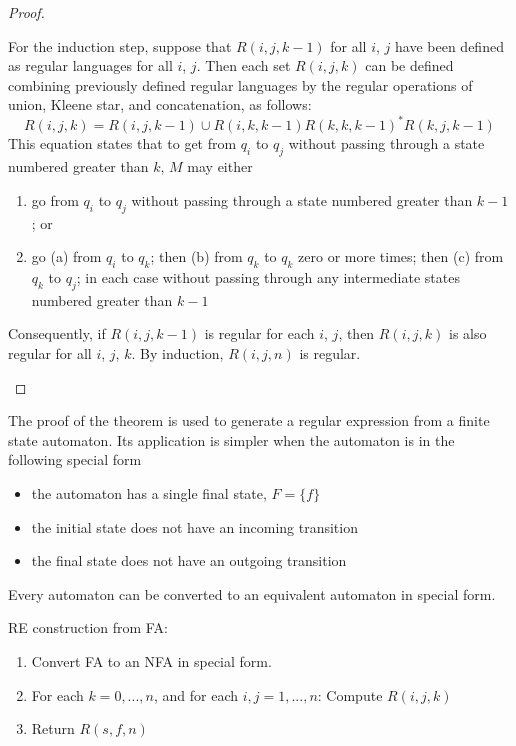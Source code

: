 \begin{proof}
\begin{itemize}
    \quad For the induction step, suppose that $R(i, j, k-1)$ for all $i$, $j$ have been defined as regular languages for all $i$, $j$. Then each set $R(i, j, k)$ can be defined combining previously defined regular languages by the regular operations of union, Kleene star, and concatenation, as follows:
    \begin{equation*}
      R(i, j, k) = R(i, j, k - 1) \cup R(i, k, k - 1) R(k, k, k - 1)^* R(k, j, k - 1)
    \end{equation*}
    This equation states that to get from $q_i$ to $q_j$ without passing through a state numbered greater than $k$, $M$ may either
    \begin{enumerate}
      \item go from $q_i$ to $q_j$ without passing through a state numbered greater than $k - 1$; or
      \item go (a) from $q_i$ to $q_k$; then (b) from $q_k$ to $q_k$ zero or more times; then (c) from $q_k$ to $q_j$; in each case without passing through any intermediate states numbered greater than $k - 1$
    \end{enumerate}
    Consequently, if $R(i, j, k - 1)$ is regular for each $i$, $j$, then $R(i, j, k)$ is also regular for all $i$, $j$, $k$. By induction, $R(i, j, n)$ is regular.
  \end{itemize}
\end{proof}

The proof of the theorem is used to generate a regular expression from a finite state automaton. Its application is simpler when the automaton is in the following special form
\begin{itemize}
  \item the automaton has a single final state, $F = \{f\}$
  \item the initial state does not have an incoming transition
  \item the final state does not have an outgoing transition
\end{itemize}

\noindent Every automaton can be converted to an equivalent automaton in special form.

\quad RE construction from FA:
\begin{enumerate}
  \item Convert FA to an NFA in special form.
  \item For each $k = 0, ..., n$, and for each $i, j = 1, ..., n$: Compute $R(i, j, k)$
  \item Return $R(s, f, n)$
\end{enumerate}


